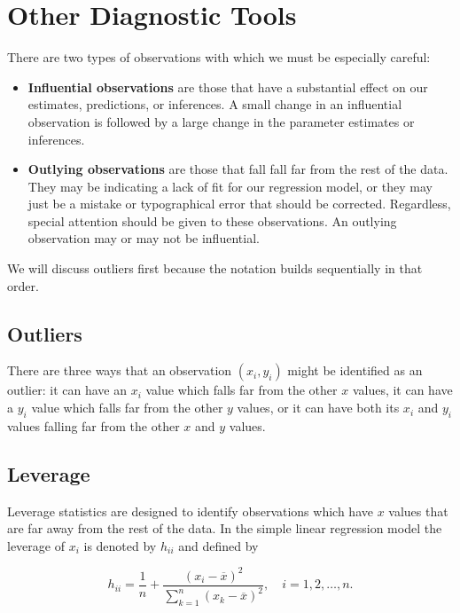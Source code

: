 \documentclass[]{book}
\providecommand{\tightlist}{%
  \setlength{\itemsep}{0pt}\setlength{\parskip}{0pt}}
\numberwithin{equation}{chapter}
\numberwithin{figure}{chapter}
\theoremstyle{plain}
\theoremstyle{definition}
\theoremstyle{remark}
\theoremstyle{definition}
\theoremstyle{definition}
\theoremstyle{remark}
\begin{document}
\section{Other Diagnostic Tools}\label{sec-other-diagnostic-tools-slr}

There are two types of observations with which we must be especially
careful:

\begin{itemize}
\tightlist
\item
  \textbf{Influential observations} are those that have a substantial
  effect on our estimates, predictions, or inferences. A small change in
  an influential observation is followed by a large change in the
  parameter estimates or inferences.
\item
  \textbf{Outlying observations} are those that fall fall far from the
  rest of the data. They may be indicating a lack of fit for our
  regression model, or they may just be a mistake or typographical error
  that should be corrected. Regardless, special attention should be
  given to these observations. An outlying observation may or may not be
  influential.
\end{itemize}

We will discuss outliers first because the notation builds sequentially
in that order.

\subsection{Outliers}\label{outliers}

There are three ways that an observation \((x_{i},y_{i})\) might be
identified as an outlier: it can have an \(x_{i}\) value which falls far
from the other \(x\) values, it can have a \(y_{i}\) value which falls
far from the other \(y\) values, or it can have both its \(x_{i}\) and
\(y_{i}\) values falling far from the other \(x\) and \(y\) values.

\subsection{Leverage}\label{leverage}

Leverage statistics are designed to identify observations which have
\(x\) values that are far away from the rest of the data. In the simple
linear regression model the leverage of \(x_{i}\) is denoted by
\(h_{ii}\) and defined by

\begin{equation}
h_{ii}=\frac{1}{n}+\frac{(x_{i}-\overline{x})^{2}}{\sum_{k=1}^{n}(x_{k}-\overline{x})^{2}},\quad i=1,2,\ldots,n.
\end{equation}
\end{document}
